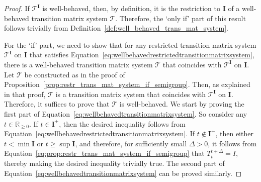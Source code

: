 \documentclass[10pt,a4paper]{paper}
\theoremstyle{definition}
\newcommand{\reals}{\mathbb{R}}
\newcommand{\realsnonneg}{\reals_{\geq 0}}
\begin{document}
\propwellrestrtransmatsystemiflimsup*
\begin{proof}
If $\mathcal{T}^{\mathbf{I}}$ is well-behaved, then, by definition, it is the restriction to $\mathbf{I}$ of a well-behaved transition matrix system $\mathcal{T}$. Therefore, the `only if' part of this result follows trivially from Definition~\ref{def:well_behaved_trans_mat_system}.

For the `if' part, we need to show that for any restricted transition matrix system $\mathcal{T}^\mathbf{I}$ on $\mathbf{I}$ that satisfies Equation~\eqref{eq:wellbehavedrestrictedtransitionmatrixsystem}, there is a well-behaved transition matrix system $\mathcal{T}$ that coincides with $\mathcal{T}^\mathbf{I}$ on $\mathbf{I}$. Let $\mathcal{T}$ be constructed as in the proof of Proposition~\ref{prop:restr_trans_mat_system_if_semigroup}. Then, as explained in that proof, $\mathcal{T}$ is a transition matrix system that coincides with $\mathcal{T}^{\mathbf{I}}$ on $\mathbf{I}$. Therefore, it suffices to prove that $\mathcal{T}$ is well-behaved. We start by proving the first part of Equation~\eqref{eq:wellbehavedtransitionmatrixsystem}. So consider any $t\in\realsnonneg$. If $t\in\mathbf{I}^+$, then the desired inequality follows from Equation~\eqref{eq:wellbehavedrestrictedtransitionmatrixsystem}. If $t\notin\mathbf{I}^+$, then either $t<\min\mathbf{I}$ or $t\geq\sup\mathbf{I}$, and therefore, for sufficiently small $\Delta>0$, it follows from Equation~\eqref{eq:prop:restr_trans_mat_system_if_semigroup} that $T_t^{t+\Delta}=I$, thereby making the desired inequality trivially true. The second part of Equation~\eqref{eq:wellbehavedtransitionmatrixsystem} can be proved similarly.
\end{proof}
\end{document}
